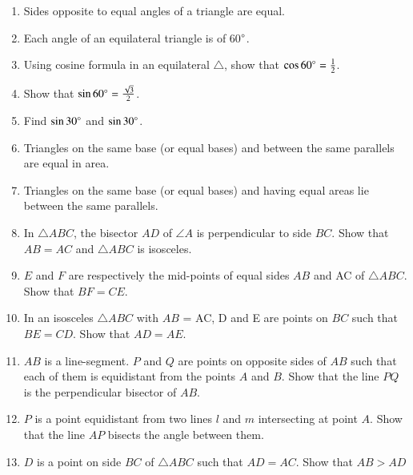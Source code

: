 \begin{enumerate}[label=\thesection.\arabic*.,ref=\thesection.\theenumi]
\item  Sides opposite to equal angles of a triangle are equal. 
%
\item  Each angle of an equilateral triangle is of 60$\degree$. 
%
\item Using cosine formula in an equilateral $\triangle$, show that $\cos 60\degree = \frac{1}{2} $.  
\item Show that $\sin 60\degree = \frac{\sqrt{3}}{2} $.
\item Find  $\sin 30\degree$ and  $\sin 30\degree$.
\item Triangles on the same base (or equal bases) and between the same parallels are equal in area.
\item Triangles on the same base (or equal bases) and having equal areas lie between the same parallels.
\item In $\triangle ABC$, the bisector $AD$ of $\angle  A$ is perpendicular to side $BC$. Show that $AB = AC$ and $\triangle ABC$ is isosceles.
\item $E$ and $F$ are respectively the mid-points of equal sides $AB$ and AC of $\triangle ABC$. Show that $BF = CE$. 
\item In an isosceles $\triangle ABC$ with $AB$ = AC, D and E are points on $BC$ such that $BE = CD$. Show that $AD = AE$. 
%
\item $AB$ is a line-segment. $P$ and $Q$ are points on opposite sides of $AB$ such that each of them is equidistant from the points $A$ and $B$. Show that the line $PQ $ is the perpendicular bisector of $AB$.
%
\item $P$ is a point equidistant from two lines $l$ and $m$ intersecting at point $A$.  Show that the line  $AP$  bisects the angle between them.
%
\item $D$ is a point on side $BC$ of $\triangle  ABC$ such that $AD = AC$. Show that $AB > AD$


\end{enumerate}
